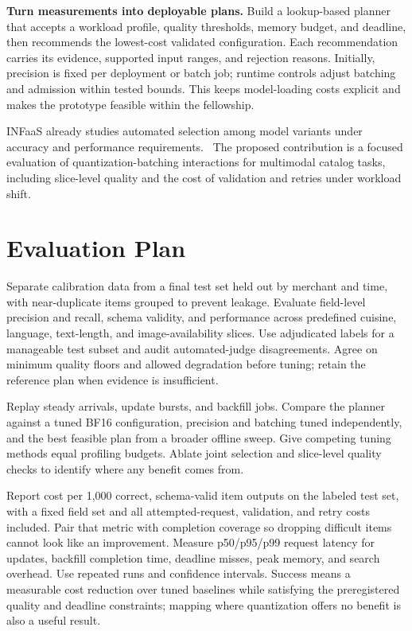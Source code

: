 \documentclass{article}
\begin{document}
\textbf{Turn measurements into deployable plans.} Build a lookup-based planner that accepts a workload profile, quality thresholds, memory budget, and deadline, then recommends the lowest-cost validated configuration. Each recommendation carries its evidence, supported input ranges, and rejection reasons. Initially, precision is fixed per deployment or batch job; runtime controls adjust batching and admission within tested bounds. This keeps model-loading costs explicit and makes the prototype feasible within the fellowship.

INFaaS already studies automated selection among model variants under accuracy and performance requirements.~\citep{romero2021infaas} The proposed contribution is a focused evaluation of quantization-batching interactions for multimodal catalog tasks, including slice-level quality and the cost of validation and retries under workload shift.

\section{Evaluation Plan}
Separate calibration data from a final test set held out by merchant and time, with near-duplicate items grouped to prevent leakage. Evaluate field-level precision and recall, schema validity, and performance across predefined cuisine, language, text-length, and image-availability slices. Use adjudicated labels for a manageable test subset and audit automated-judge disagreements. Agree on minimum quality floors and allowed degradation before tuning; retain the reference plan when evidence is insufficient.

Replay steady arrivals, update bursts, and backfill jobs. Compare the planner against a tuned BF16 configuration, precision and batching tuned independently, and the best feasible plan from a broader offline sweep. Give competing tuning methods equal profiling budgets. Ablate joint selection and slice-level quality checks to identify where any benefit comes from.

Report cost per 1,000 correct, schema-valid item outputs on the labeled test set, with a fixed field set and all attempted-request, validation, and retry costs included. Pair that metric with completion coverage so dropping difficult items cannot look like an improvement. Measure p50/p95/p99 request latency for updates, backfill completion time, deadline misses, peak memory, and search overhead. Use repeated runs and confidence intervals. Success means a measurable cost reduction over tuned baselines while satisfying the preregistered quality and deadline constraints; mapping where quantization offers no benefit is also a useful result.
\end{document}
